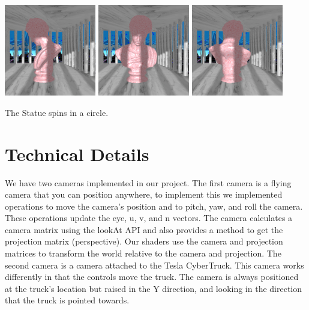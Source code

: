 \documentclass[10pt,letterpaper,oneside]{article}
\numberwithin{equation}{section}		%
\numberwithin{figure}{section}			%
\numberwithin{table}{section}				%
\begin{document}
\begin{center}
    \includegraphics[width=0.3\textwidth]{statue1.png}
    \includegraphics[width=0.3\textwidth]{statue2.png}
    \includegraphics[width=0.3\textwidth]{statue3.png}
    
    The Statue spins in a circle.
\end{center}

\newpage
\section{Technical Details}

We have two cameras implemented in our project. The first camera is a flying camera that you can position anywhere, to implement this we implemented operations to move the camera's position and to pitch, yaw, and roll the camera. These operations update the eye, u, v, and n vectors. The camera calculates a camera matrix using the lookAt API and also provides a method to get the projection matrix (perspective). Our shaders use the camera and projection matrices to transform the world relative to the camera and projection. The second camera is a camera attached to the Tesla CyberTruck. This camera works differently in that the controls move the truck. The camera is always positioned at the truck's location but raised in the Y direction, and looking in the direction that the truck is pointed towards.
\end{document}
